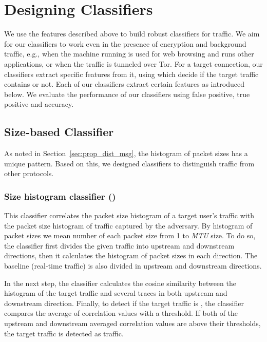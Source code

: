 \section{Designing \bc Classifiers}
We use the features described above to build robust classifiers for \bc traffic. 
We aim for our classifiers to work even in the presence of encryption and background traffic, e.g., 
when the machine running \bc is used for web browsing and runs other applications, or when the \bc traffic is tunneled over Tor. %
For a target connection, our classifiers extract specific features from it, using which decide if the target traffic contains \bc or not. Each of our classifiers extract certain features as introduced below. We evaluate the performance of our classifiers using false positive, true positive and accuracy.

\subsection{Size-based Classifier}
As noted in Section~\ref{sec:prop_dist_msg}, the histogram of \bc packet sizes has a unique pattern. Based on this, we designed  classifiers to distinguish \bc traffic from other protocols. 

\subsubsection{Size histogram classifier ()}\label{sec:all-packet-size-classifier}

This classifier correlates the packet size histogram of a target user's traffic with the packet size histogram of \bc traffic captured by the adversary. By histogram of packet sizes we mean number of each packet size from 1 to \textit{MTU} size. To do so, the classifier first divides the given traffic into upstream and downstream directions, then it calculates the histogram of packet sizes in each direction.  The baseline (real-time \bc traffic) is also divided in upstream and downstream directions. 

In the next step, the classifier calculates the cosine similarity between the histogram of the target traffic and several \bc traces in both upstream and downstream direction. Finally, to detect if the target traffic is \bc, the classifier compares the average of correlation values with a threshold. If both of the upstream and downstream averaged correlation values are above their thresholds, the target traffic is detected as \bc traffic. %


